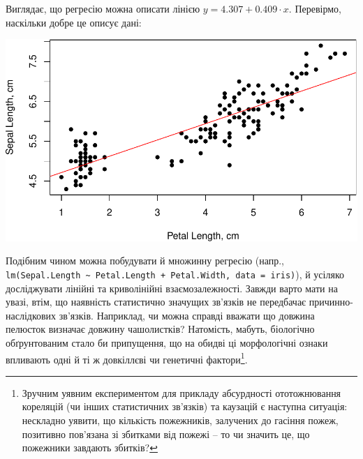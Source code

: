 \documentclass[
  11pt,
]{book}
\newenvironment{Shaded}{\begin{snugshade}}{\end{snugshade}}
\newcommand{\AttributeTok}[1]{\textcolor[rgb]{0.13,0.29,0.53}{#1}}
\newcommand{\CommentTok}[1]{\textcolor[rgb]{0.56,0.35,0.01}{\textit{#1}}}
\newcommand{\DecValTok}[1]{\textcolor[rgb]{0.00,0.00,0.81}{#1}}
\newcommand{\FloatTok}[1]{\textcolor[rgb]{0.00,0.00,0.81}{#1}}
\newcommand{\FunctionTok}[1]{\textcolor[rgb]{0.13,0.29,0.53}{\textbf{#1}}}
\newcommand{\NormalTok}[1]{#1}
\newcommand{\SpecialCharTok}[1]{\textcolor[rgb]{0.81,0.36,0.00}{\textbf{#1}}}
\newcommand{\StringTok}[1]{\textcolor[rgb]{0.31,0.60,0.02}{#1}}
\begin{document}
Виглядає, що регресію можна описати лінією \(y = 4.307 + 0.409 \cdot x\). Перевірмо, наскільки добре це описує дані:

\begin{Shaded}
\end{Shaded}

\includegraphics{bookdown-demo_files/figure-latex/unnamed-chunk-19-1.pdf}

Подібним чином можна побудувати й множинну регресію (напр., \texttt{lm(Sepal.Length\ \textasciitilde{}\ Petal.Length\ +\ Petal.Width,\ data\ =\ iris)}), й усіляко досліджувати лінійні та криволінійні взаємозалежності. Завжди варто мати на увазі, втім, що наявність статистично значущих зв'язків не передбачає причинно-наслідкових зв'язків. Наприклад, чи можна справді вважати що довжина пелюсток визначає довжину чашолистків? Натомість, мабуть, біологічно обґрунтованим стало би припущення, що на обидві ці морфологічні ознаки впливають одні й ті ж довкіллєві чи генетичні фактори\footnote{Зручним уявним експериментом для прикладу абсурдності ототожнювання кореляцій (чи інших статистичних зв'язків) та каузацій є наступна ситуація: нескладно уявити, що кількість пожежників, залучених до гасіння пожеж, позитивно пов'язана зі збитками від пожежі -- то чи значить це, що пожежники завдають збитків?}.
\end{document}

